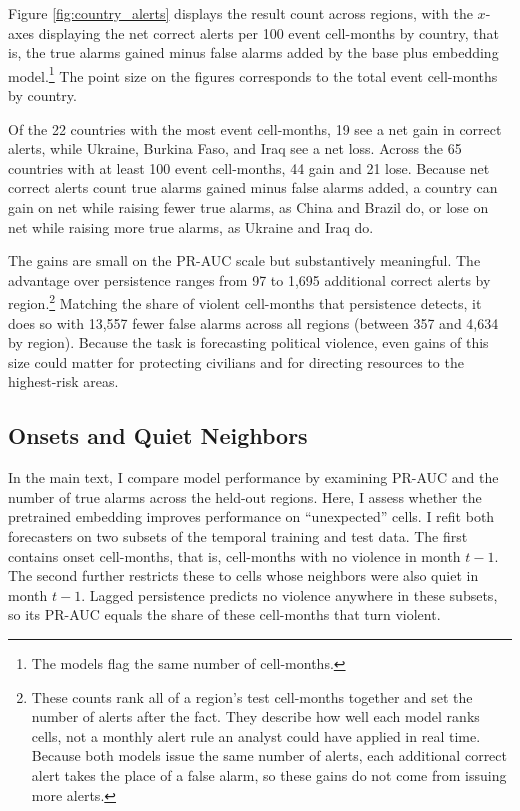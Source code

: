 \documentclass[11pt, letterpaper]{article}
\begin{document}
Figure \ref{fig:country_alerts} displays the result count across regions, with the $x$-axes displaying the net correct alerts per 100 event cell-months by country, that is, the true alarms gained minus false alarms added by the base plus embedding model.\footnote{The models flag the same number of cell-months.}  The point size on the figures corresponds to the total event cell-months by country. 



Of the 22 countries with the most event cell-months, 19 see a net gain in correct alerts, while Ukraine, Burkina Faso, and Iraq see a net loss. Across the 65 countries with at least 100 event cell-months, 44 gain and 21 lose. Because net correct alerts count true alarms gained minus false alarms added, a country can gain on net while raising fewer true alarms, as China and Brazil do, or lose on net while raising more true alarms, as Ukraine and Iraq do.


The gains are small on the PR-AUC scale but substantively meaningful. The advantage over persistence ranges from 97 to 1,695 additional correct alerts by region.\footnote{These counts rank all of a region's test cell-months together and set the number of alerts after the fact. They describe how well each model ranks cells, not a monthly alert rule an analyst could have applied in real time. Because both models issue the same number of alerts, each additional correct alert takes the place of a false alarm, so these gains do not come from issuing more alerts.} Matching the share of violent cell-months that persistence detects, it does so with 13,557 fewer false alarms across all regions (between 357 and 4,634 by region). Because the task is forecasting political violence, even gains of this size could matter for protecting civilians and for directing resources to the highest-risk areas.

\subsection{Onsets and Quiet Neighbors}
\label{app:onset}
In the main text, I compare model performance by examining PR-AUC and the number of true alarms across the held-out regions. Here, I assess whether the pretrained embedding improves performance on ``unexpected'' cells. I refit both forecasters on two subsets of the temporal training and test data. The first contains onset cell-months, that is, cell-months with no violence in month $t-1$. The second further restricts these to cells whose neighbors were also quiet in month $t-1$. Lagged persistence predicts no violence anywhere in these subsets, so its PR-AUC equals the share of these cell-months that turn violent.
\end{document}
